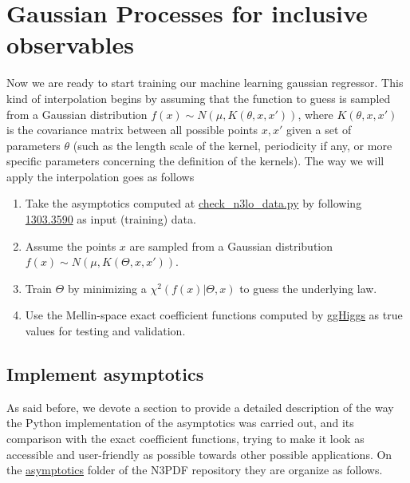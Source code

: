 \documentclass[12pt]{article}
\begin{document}
\section{Gaussian Processes for inclusive observables}
Now we are ready to start training our machine learning gaussian regressor. This kind of interpolation begins by assuming that the function to guess is sampled from a Gaussian distribution $f(x) \sim N(\mu, K(\theta, x, x'))$, where $K(\theta, x, x')$ is the covariance matrix between all possible points $x, x'$ given a set of parameters $\theta$ (such as the length scale of the kernel, periodicity if any, or more specific parameters concerning the definition of the kernels). The way we will apply the interpolation goes as follows
\begin{enumerate}
	\item Take the asymptotics computed at \href{https://github.com/N3PDF/crystalball/blob/jesus_gp/asymptotics/check_n3lo_data.py}{{\color{blue}check\_n3lo\_data.py}} by following \href{https://arxiv.org/abs/1303.3590}{1303.3590} as input (training) data.
	\item Assume the points $x$ are sampled from a Gaussian distribution $f(x) \sim N(\mu, K(\Theta, x, x'))$.
	\item Train $\Theta$ by minimizing a $\chi^{2}(f(x)|\Theta, x)$ to guess the underlying law.
	\item Use the Mellin-space exact coefficient functions computed by \href{https://www.ge.infn.it/~bonvini/higgs/}{ggHiggs} as true values for testing and validation.
\end{enumerate}

\subsection{Implement asymptotics}
As said before, we devote a section to provide a detailed description of the way the Python implementation of the asymptotics was carried out, and its comparison with the exact coefficient functions, trying to make it look as accessible and user-friendly as possible towards other possible applications. On the  \href{https://github.com/N3PDF/crystalball/tree/jesus_gp/asymptotics}{asymptotics} folder of the N3PDF repository they are organize as follows. 
\end{document}
